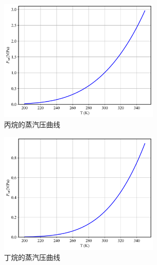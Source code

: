 \documentclass[12pt,a4paper]{article}
\begin{document}
\begin{figure}[H]
    \centering
    \includegraphics[width=0.7\textwidth]{../chp7/figs/丙烷.png}
    \caption{丙烷的蒸汽压曲线}
\end{figure}
\begin{figure}[H]
    \centering
    \includegraphics[width=0.7\textwidth]{../chp7/figs/丁烷.png}
    \caption{丁烷的蒸汽压曲线}
\end{figure}
\end{document}
